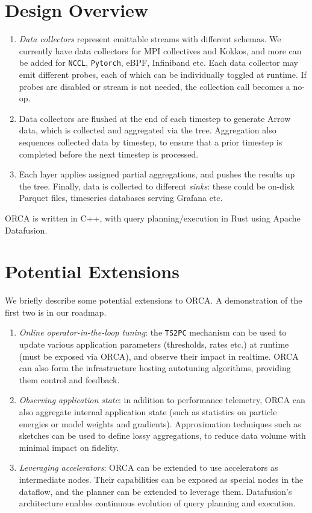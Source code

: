\documentclass[
  letterpaper,
  DIV=11,
  numbers=noendperiod]{scrartcl}
\providecommand{\tightlist}{%
  \setlength{\itemsep}{0pt}\setlength{\parskip}{0pt}}\usepackage{longtable,booktabs,array}
\begin{document}
\section{Design Overview}\label{design-overview}

\begin{enumerate}
\def\labelenumi{\arabic{enumi}.}
\tightlist
\item
  \emph{Data collectors} represent emittable streams with different
  schemas. We currently have data collectors for MPI collectives and
  Kokkos, and more can be added for \texttt{NCCL}, \texttt{Pytorch},
  eBPF, Infiniband etc. Each data collector may emit different probes,
  each of which can be individually toggled at runtime. If probes are
  disabled or stream is not needed, the collection call becomes a no-op.
\item
  Data collectors are flushed at the end of each timestep to generate
  Arrow data, which is collected and aggregated via the tree.
  Aggregation also sequences collected data by timestep, to ensure that
  a prior timestep is completed before the next timestep is processed.
\item
  Each layer applies assigned partial aggregations, and pushes the
  results up the tree. Finally, data is collected to different
  \emph{sinks}: these could be on-disk Parquet files, timeseries
  databases serving Grafana etc.
\end{enumerate}

ORCA is written in C++, with query planning/execution in Rust using
Apache Datafusion.

\section{Potential Extensions}\label{potential-extensions}

We briefly describe some potential extensions to ORCA. A demonstration
of the first two is in our roadmap.

\begin{enumerate}
\def\labelenumi{\arabic{enumi}.}
\item
  \emph{Online operator-in-the-loop tuning}: the \texttt{TS2PC}
  mechanism can be used to update various application parameters
  (thresholds, rates etc.) at runtime (must be exposed via ORCA), and
  observe their impact in realtime. ORCA can also form the
  infrastructure hosting autotuning algorithms, providing them control
  and feedback.
\item
  \emph{Observing application state}: in addition to performance
  telemetry, ORCA can also aggregate internal application state (such as
  statistics on particle energies or model weights and gradients).
  Approximation techniques such as sketches can be used to define lossy
  aggregations, to reduce data volume with minimal impact on fidelity.
\item
  \emph{Leveraging accelerators}: ORCA can be extended to use
  accelerators as intermediate nodes. Their capabilities can be exposed
  as special nodes in the dataflow, and the planner can be extended to
  leverage them. Datafusion's architecture enables continuous evolution
  of query planning and execution.
\end{enumerate}
\end{document}
